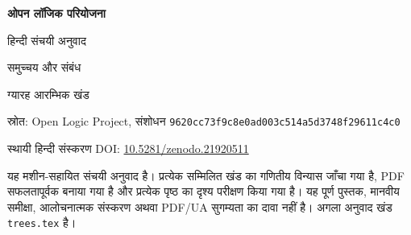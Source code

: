 \documentclass[../../../include/open-logic-section]{subfiles}
\begin{document}
\begingroup
\thispagestyle{empty}
\centering
\vspace*{0.11\textheight}
{\Huge\bfseries ओपन लॉजिक परियोजना\par}
\vspace{0.8cm}
{\LARGE हिन्दी संचयी अनुवाद\par}
\vspace{1.0cm}
{\Large समुच्चय और संबंध\par}
\vspace{0.4cm}
{\large ग्यारह आरम्भिक खंड\par}
\vfill
{\normalsize स्रोत: Open Logic Project, संशोधन
\texttt{9620cc73f9c8e0ad003c514a5d3748f29611c4c0}\par}
\vspace{0.35cm}
{\normalsize स्थायी हिन्दी संस्करण DOI:
\href{https://doi.org/10.5281/zenodo.21920511}{10.5281/zenodo.21920511}\par}
\vspace{0.35cm}
{\small यह मशीन-सहायित संचयी अनुवाद है। प्रत्येक सम्मिलित खंड का
गणितीय विन्यास जाँचा गया है, PDF सफलतापूर्वक बनाया गया है और प्रत्येक
पृष्ठ का दृश्य परीक्षण किया गया है। यह पूर्ण पुस्तक, मानवीय समीक्षा,
आलोचनात्मक संस्करण अथवा PDF/UA सुगम्यता का दावा नहीं है। अगला अनुवाद
खंड \texttt{trees.tex} है।\par}
\vspace*{0.06\textheight}
\par
\endgroup
\clearpage
\raggedbottom

\tableofcontents*
\clearpage










\begin{sloppypar}

\end{sloppypar}

\end{document}
